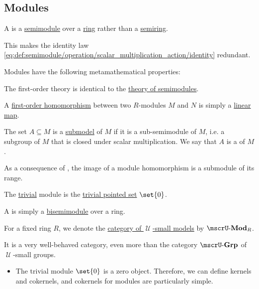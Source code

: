 \subsection{Modules}\label{subsec:modules}

\begin{definition}\label{def:module}
  A  is a \hyperref[def:semimodule]{semimodule} over a \hyperref[def:ring]{ring} rather than a \hyperref[def:semiring]{semiring}.

  This makes the identity law \eqref{eq:def:semimodule/operation/scalar_multiplication_action/identity} redundant.

  Modules have the following metamathematical properties:
  \begin{thmenum}
     The first-order theory is identical to the \hyperref[def:semimodule/theory]{theory of semimodules}.

     A \hyperref[def:first_order_homomorphism]{first-order homomorphism} between two \( R \)-modules \( M \) and \( N \) is simply a \hyperref[def:semimodule/homomorphism]{linear map}.

     The set \( A \subseteq M \) is a \hyperref[thm:substructure_is_model]{submodel} of \( M \) if it is a sub-semimodule of \( M \), i.e. a subgroup of \( M \) that is closed under scalar multiplication. We say that \( A \) is a  of \( M \).

    As a consequence of , the image of a module homomorphism is a submodule of its range.

     The \hyperref[thm:substructures_form_complete_lattice/bottom]{trivial} module is the \hyperref[def:pointed_set/trivial]{trivial pointed set} \( \set{ 0 } \).

     A  is simply a \hyperref[def:semimodule/bisemimodule]{bisemimodule} over a ring.

     For a fixed ring \( R \), we denote the \hyperref[def:category_of_small_first_order_models]{category of \( \mscrU \)-small models} by \( \ucat{Mod}_R \).

    It is a very well-behaved category, even more than the category \hyperref[def:group/category]{\( \ucat{Grp} \)} of \( \mscrU \)-small groups.
    \begin{itemize}
      \item The trivial module \( \set{ 0 } \) is a zero object. Therefore, we can define kernels and cokernels, and cokernels for modules are particularly simple.


\end{itemize}
\end{thmenum}
\end{definition}
